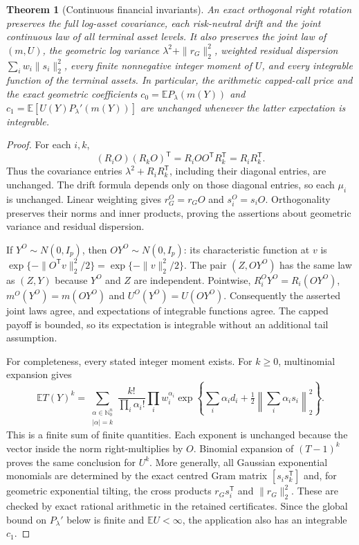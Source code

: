 \documentclass[11pt,a4paper]{article}
\newtheorem{theorem}{Theorem}[section]
\newcommand{\E}{\mathbb E}
\begin{document}
\begin{theorem}[Continuous financial invariants]\label{thm:invariants}
An exact orthogonal right rotation preserves the full log-asset covariance,
each risk-neutral drift and the joint continuous law of all terminal asset
levels. It also preserves the joint law of $(m,U)$, the geometric log
variance $\lambda^2+\|r_G\|_2^2$, weighted residual dispersion
$\sum_i w_i\|s_i\|_2^2$, every finite nonnegative integer moment of $U$,
and every integrable function of the terminal assets. In particular, the
arithmetic capped-call price and the exact geometric coefficients
$c_0=\E P_\lambda(m(Y))$ and
$c_1=\E[U(Y)P_\lambda'(m(Y))]$ are unchanged whenever the latter
expectation is integrable.
\end{theorem}
\begin{proof}
For each $i,k$,
\[
 (R_iO)(R_kO)^\mathsf T=R_iOO^\mathsf T R_k^\mathsf T
 =R_iR_k^\mathsf T.
\]
Thus the covariance entries
$\lambda^2+R_iR_k^\mathsf T$, including their diagonal entries, are
unchanged. The drift formula depends only on those diagonal entries, so
each $\mu_i$ is unchanged. Linear weighting gives
$r_G^O=r_GO$ and $s_i^O=s_iO$.
Orthogonality preserves their norms and inner products, proving the
assertions about geometric variance and residual dispersion.

If $Y^O\sim N(0,I_p)$, then $OY^O\sim N(0,I_p)$: its characteristic
function at $v$ is
$\exp\{-\|O^\mathsf T v\|_2^2/2\}=\exp\{-\|v\|_2^2/2\}$.
The pair $(Z,OY^O)$ has the same law as $(Z,Y)$ because $Y^O$ and $Z$
are independent. Pointwise,
$R^O_iY^O=R_i(OY^O)$,
$m^O(Y^O)=m(OY^O)$ and $U^O(Y^O)=U(OY^O)$.
Consequently the asserted joint laws agree, and expectations of
integrable functions agree. The capped payoff is bounded, so its
expectation is integrable without an additional tail assumption.

For completeness, every stated integer moment exists. For $k\geq0$,
multinomial expansion gives
\[
 \E T(Y)^k=
 \sum_{\substack{\alpha\in\mathbb N_0^n\\|\alpha|=k}}
 \frac{k!}{\prod_i\alpha_i!}\prod_iw_i^{\alpha_i}
 \exp\left\{\sum_i\alpha_i d_i+
       \tfrac12\left\|\sum_i\alpha_i s_i\right\|_2^2\right\}.
\]
This is a finite sum of finite quantities. Each exponent is unchanged
because the vector inside the norm right-multiplies by $O$. Binomial
expansion of $(T-1)^k$ proves the same conclusion for $U^k$.
More generally, all Gaussian exponential monomials are determined by the
exact centred Gram matrix $[s_i s_k^\mathsf T]$ and, for geometric
exponential tilting, the cross products $r_Gs_i^\mathsf T$ and
$\|r_G\|_2^2$. These are checked by exact rational arithmetic in the
retained certificates. Since the global bound on $P_\lambda'$ below is
finite and $\E U<\infty$, the application also has an integrable $c_1$.
\end{proof}
\end{document}
